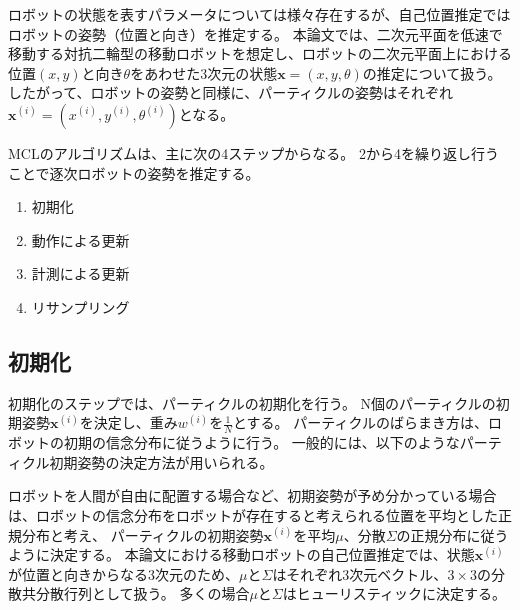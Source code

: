 ロボットの状態を表すパラメータについては様々存在するが、自己位置推定ではロボットの姿勢（位置と向き）を推定する。
本論文では、二次元平面を低速で移動する対抗二輪型の移動ロボットを想定し、ロボットの二次元平面上における位置$(x, y)$と向き$\theta$をあわせた3次元の状態$\bm{x} = (x, y, \theta)$の推定について扱う。
したがって、ロボットの姿勢と同様に、パーティクルの姿勢はそれぞれ$\bm{x}^{(i)} = (x^{(i)}, y^{(i)}, \theta^{(i)})$となる。


MCLのアルゴリズムは、主に次の4ステップからなる。
2から4を繰り返し行うことで逐次ロボットの姿勢を推定する。
\begin{enumerate}
  \item 初期化
  \item 動作による更新
  \item 計測による更新
  \item リサンプリング
\end{enumerate}




\subsection{初期化}

初期化のステップでは、パーティクルの初期化を行う。
N個のパーティクルの初期姿勢$\bm{x}^{(i)}$を決定し、重み$w^{(i)}$を$\frac{1}{N}$とする。
パーティクルのばらまき方は、ロボットの初期の信念分布に従うように行う。
一般的には、以下のようなパーティクル初期姿勢の決定方法が用いられる。

ロボットを人間が自由に配置する場合など、初期姿勢が予め分かっている場合は、ロボットの信念分布をロボットが存在すると考えられる位置を平均とした正規分布と考え、
パーティクルの初期姿勢$\bm{x}^{(i)}$を平均$\mu$、分散$\Sigma$の正規分布に従うように決定する。
本論文における移動ロボットの自己位置推定では、状態$\bm{x}^{(i)}$が位置と向きからなる3次元のため、$\mu$と$\Sigma$はそれぞれ3次元ベクトル、$3\times3$の分散共分散行列として扱う。
多くの場合$\mu$と$\Sigma$はヒューリスティックに決定する。

